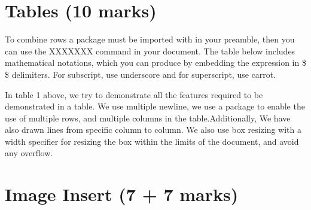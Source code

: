 \documentclass[a4paper,11pt]{article}
\begin{document}
\section{\textbf{Tables (10 marks)}}
%
To combine rows a package must be imported with in your preamble, then you can use the XXXXXXX command in your document. The table below includes mathematical notations, which you can produce by embedding the expression in \$ \$ delimiters. For subscript, use underscore and for superscript, use carrot.
\newline
\begin{table}[H]
\centering
{}
\caption{Table depicting the use of both multirow and multicolumn}
\end{table}
{\LARGE In table 1 above, we try to demonstrate all the features required to be demonstrated in a table.  We use multiple newline, we use a package to enable the use of multiple rows,  and multiple columns in the table.Additionally,  We have also drawn lines from specific column to column.   We also use box resizing with a width specifier for resizing the box within the limits of the document, and avoid any overflow.}
\pagebreak
\section{\textbf{Image Insert (7 + 7 marks)}}
\end{document}
